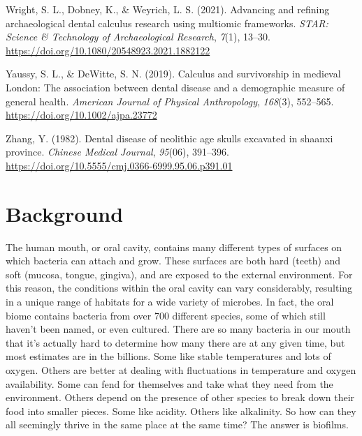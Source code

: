 \documentclass[
  b5paper,
]{book}
\newlength{\cslhangindent}
\newlength{\cslentryspacingunit} %
\newenvironment{CSLReferences}[2] %
 {%
  \setlength{\parindent}{0pt}
  \ifodd #1
  \let\oldpar\par
  \def\par{\hangindent=\cslhangindent\oldpar}
  \fi
  \setlength{\parskip}{#2\cslentryspacingunit}
 }%
 {}
\begin{document}
\begin{CSLReferences}{1}{0}
\leavevmode{}%
Wright, S. L., Dobney, K., \& Weyrich, L. S. (2021). Advancing and
refining archaeological dental calculus research using multiomic
frameworks. \emph{STAR: Science \& Technology of Archaeological
Research}, \emph{7}(1), 13--30.
\url{https://doi.org/10.1080/20548923.2021.1882122}

\leavevmode{}%
Yaussy, S. L., \& DeWitte, S. N. (2019). Calculus and survivorship in
medieval {London}: {The} association between dental disease and a
demographic measure of general health. \emph{American Journal of
Physical Anthropology}, \emph{168}(3), 552--565.
\url{https://doi.org/10.1002/ajpa.23772}

\leavevmode{}%
Zhang, Y. (1982). Dental disease of neolithic age skulls excavated in
shaanxi province. \emph{Chinese Medical Journal}, \emph{95}(06),
391--396. \url{https://doi.org/10.5555/cmj.0366-6999.95.06.p391.01}

\end{CSLReferences}


\hypertarget{chap-background}{%
\chapter{Background}\label{chap-background}}

The human mouth, or oral cavity, contains many different types of
surfaces on which bacteria can attach and grow. These surfaces are both
hard (teeth) and soft (mucosa, tongue, gingiva), and are exposed to the
external environment. For this reason, the conditions within the oral
cavity can vary considerably, resulting in a unique range of habitats
for a wide variety of microbes. In fact, the oral biome contains
bacteria from over 700 different species, some of which still haven't
been named, or even cultured. There are so many bacteria in our mouth
that it's actually hard to determine how many there are at any given
time, but most estimates are in the billions. Some like stable
temperatures and lots of oxygen. Others are better at dealing with
fluctuations in temperature and oxygen availability. Some can fend for
themselves and take what they need from the environment. Others depend
on the presence of other species to break down their food into smaller
pieces. Some like acidity. Others like alkalinity. So how can they all
seemingly thrive in the same place at the same time? The answer is
biofilms.
\end{document}
